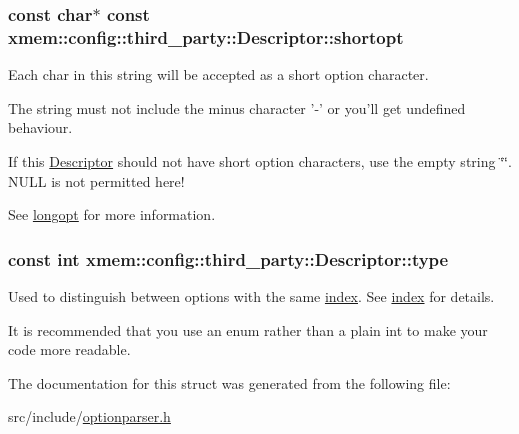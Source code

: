 \hypertarget{structxmem_1_1config_1_1third__party_1_1_descriptor_ac2dfb6bb8ca2f4aabf964a910cf0d59b}{
\subsubsection[{shortopt}]{\setlength{\rightskip}{0pt plus 5cm}const char$\ast$ const xmem\-::config\-::third\-\_\-party\-::\-Descriptor\-::shortopt}}\label{structxmem_1_1config_1_1third__party_1_1_descriptor_ac2dfb6bb8ca2f4aabf964a910cf0d59b}


Each char in this string will be accepted as a short option character. 

The string must not include the minus character {\ttfamily '-\/'} or you'll get undefined behaviour.

If this \hyperlink{structxmem_1_1config_1_1third__party_1_1_descriptor}{Descriptor} should not have short option characters, use the empty string \char`\"{}\char`\"{}. N\-U\-L\-L is not permitted here!

See \hyperlink{structxmem_1_1config_1_1third__party_1_1_descriptor_a7246a4bfc669f68bb406dece398be7bb}{longopt} for more information. \hypertarget{structxmem_1_1config_1_1third__party_1_1_descriptor_a4b9e9a5c9b08ef575ea4f603c54bff63}{
\subsubsection[{type}]{\setlength{\rightskip}{0pt plus 5cm}const int xmem\-::config\-::third\-\_\-party\-::\-Descriptor\-::type}}\label{structxmem_1_1config_1_1third__party_1_1_descriptor_a4b9e9a5c9b08ef575ea4f603c54bff63}


Used to distinguish between options with the same \hyperlink{structxmem_1_1config_1_1third__party_1_1_descriptor_aacf3d44f35c61f22be65da078f60734b}{index}. See \hyperlink{structxmem_1_1config_1_1third__party_1_1_descriptor_aacf3d44f35c61f22be65da078f60734b}{index} for details. 

It is recommended that you use an enum rather than a plain int to make your code more readable. 

The documentation for this struct was generated from the following file\-:\begin{DoxyCompactItemize}
\item 
src/include/\hyperlink{optionparser_8h}{optionparser.\-h}\end{DoxyCompactItemize}
